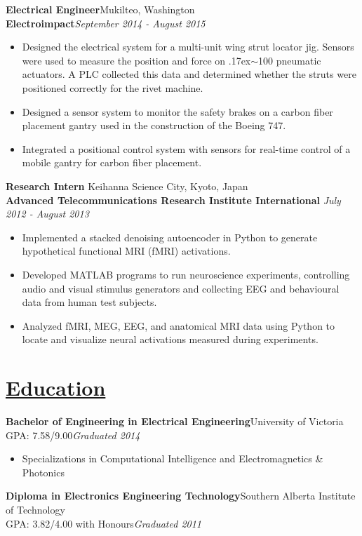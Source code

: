 \documentclass[a4paper, 11pt]{article}
\begin{document}
  \textbf{Electrical Engineer}\hfill Mukilteo, Washington\\
  \textbf{Electroimpact}\hfill \emph{September 2014 - August 2015}\smallskip
  \begin{itemize}[nosep]
    \item Designed the electrical system for a multi-unit wing strut locator jig.  Sensors were used to measure the position and force on {\raise.17ex\hbox{$\scriptstyle\sim$}}100 pneumatic actuators.  A PLC collected this data and determined whether the struts were positioned correctly for the rivet machine.
    \item Designed a sensor system to monitor the safety brakes on a carbon fiber placement gantry used in the construction of the Boeing 747.
    \item Integrated a positional control system with sensors for real-time control of a mobile gantry for carbon fiber placement.
  \end{itemize}
  \medskip

  \textbf{Research Intern} \hfill Keihanna Science City, Kyoto, Japan \\
  \textbf{Advanced Telecommunications Research Institute International} \hfill \emph{July 2012 - August 2013}\smallskip
  \begin{itemize}[nosep]
    \item Implemented a stacked denoising autoencoder in Python to generate hypothetical functional MRI (fMRI) activations.
    \item Developed MATLAB programs to run neuroscience experiments, controlling audio and visual stimulus generators and collecting EEG and behavioural data from human test subjects.
    \item Analyzed fMRI, MEG, EEG, and anatomical MRI data using Python to locate and visualize neural activations measured during experiments.
  \end{itemize}
  \medskip

\section{\underline{Education}}
  \textbf{Bachelor of Engineering in Electrical Engineering}\hfill University of Victoria\\
  GPA: 7.58/9.00\hfill\emph{Graduated 2014}\smallskip
  \begin{itemize}[nosep]
    \item Specializations in Computational Intelligence and Electromagnetics \& Photonics
  \end{itemize}
  \medskip
  
  \textbf{Diploma in Electronics Engineering Technology}\hfill Southern Alberta Institute of Technology\\
  GPA: 3.82/4.00 with Honours\hfill\emph{Graduated 2011}\smallskip
  
\end{document}
